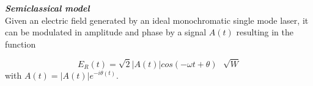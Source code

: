 \begin{bibunit}[plain]



\noindent
{\bf \em Semiclassical model}\\
%
%
Given an electric field generated by an ideal monochromatic single mode laser, it can be modulated in amplitude and phase by a signal $A(t)$ resulting in the function

\begin{equation}
    E_R(t)=\sqrt{2} |A(t)| cos\left(-\omega t + \theta\right) \,\,\,\, \sqrt{W}
\end{equation}
with $A(t)=|A(t)|e^{-i\theta(t)}$.


\end{bibunit}
